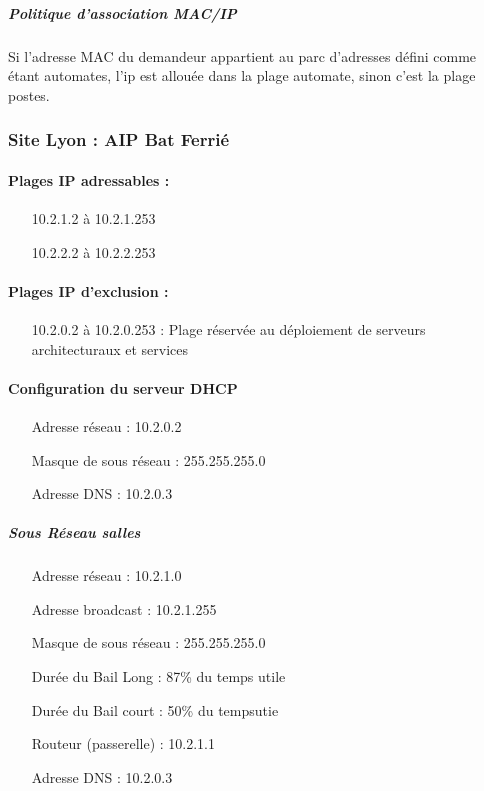 \documentclass[a4paper]{article}
\begin{document}
\subparagraph{Politique d'association MAC/IP}
Si l'adresse MAC du demandeur appartient au parc d'adresses défini comme étant automates, l'ip est allouée dans la plage automate, sinon c'est la plage postes.

\subsubsection{Site Lyon : AIP Bat Ferrié}

\paragraph{Plages IP adressables :} 
\begin{itemize}
\item[10.2.1.2 à 10.2.1.253]
\item[10.2.2.2 à 10.2.2.253]
\end{itemize}

\paragraph{Plages IP d'exclusion :}
\begin{itemize}
\item[10.2.0.2 à 10.2.0.253] : Plage réservée au déploiement de serveurs architecturaux et services
\end{itemize}

\paragraph{Configuration du serveur DHCP}

\begin{itemize}
\item[Adresse réseau]: 10.2.0.2
\item[Masque de sous réseau]: 255.255.255.0
\item[Adresse DNS]: 10.2.0.3
\end{itemize}

\subparagraph{Sous Réseau salles}
\begin{itemize}
\item[Adresse réseau]: 10.2.1.0
\item[Adresse broadcast]: 10.2.1.255
\item[Masque de sous réseau]: 255.255.255.0
\item[Durée du Bail Long]: 87\% du temps utile
\item[Durée du Bail court]: 50\% du tempsutie
\item[Routeur (passerelle)]: 10.2.1.1
\item[Adresse DNS]: 10.2.0.3
\end{itemize}
\end{document}
